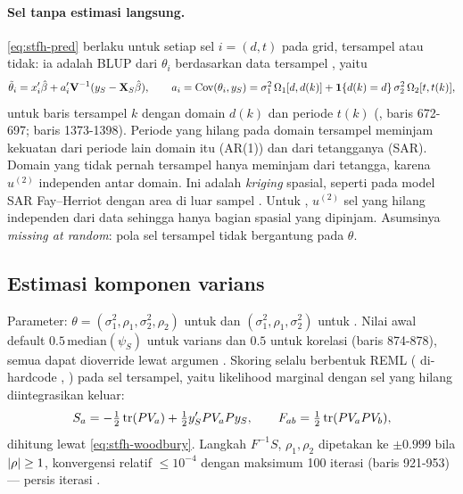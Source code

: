 \paragraph{Sel tanpa estimasi langsung.} \eqref{eq:stfh-pred} berlaku untuk
setiap sel $i=(d,t)$ pada grid, tersampel atau tidak: ia adalah BLUP dari
$\theta_i$ berdasarkan data tersampel \citep{saei2005out}, yaitu
\begin{equation}
  \tilde\theta_i=x_i'\hat\beta+a_i'\mathbf{V}^{-1}(y_S-\mathbf{X}_S\hat\beta),\qquad
  a_i=\mathrm{Cov}(\theta_i,y_S)=\sigma_1^2\,\Omega_1[d,d(k)]
  +\mathbf 1\{d(k)=d\}\,\sigma_2^2\,\Omega_2[t,t(k)],
  \label{eq:stfh-blup}
\end{equation}
untuk baris tersampel $k$ dengan domain $d(k)$ dan periode $t(k)$
(, baris 672-697; baris 1373-1398). Periode yang hilang
pada domain tersampel meminjam kekuatan dari periode lain domain itu (AR(1))
dan dari tetangganya (SAR). Domain yang tidak pernah tersampel hanya
meminjam dari tetangga, karena $u^{(2)}$ independen antar domain. Ini adalah
\emph{kriging} spasial, seperti pada model SAR Fay--Herriot dengan area di
luar sampel \citep{benedetti2024handling}. Untuk , $u^{(2)}$
sel yang hilang independen dari data sehingga hanya bagian spasial yang
dipinjam. Asumsinya \emph{missing at random}: pola sel tersampel tidak
bergantung pada $\theta$.

\subsection{Estimasi komponen varians}\label{sec:stfh-varians}

Parameter: $\theta=(\sigma_1^2,\rho_1,\sigma_2^2,\rho_2)$ untuk
 dan $(\sigma_1^2,\rho_1,\sigma_2^2)$ untuk . Nilai awal
default $0.5\,\mathrm{median}(\psi_S)$ untuk varians dan $0.5$ untuk korelasi
(baris 874-878), semua dapat dioverride lewat argumen .
Skoring selalu berbentuk REML ( di-hardcode ,
) pada sel tersampel, yaitu likelihood marginal
dengan sel yang hilang diintegrasikan keluar:
\begin{equation}
  S_a=-\tfrac12\operatorname{tr}(P V_a)+\tfrac12 y_S'P V_a P y_S,
  \qquad
  F_{ab}=\tfrac12\operatorname{tr}(P V_a P V_b),
  \label{eq:stfh-score}
\end{equation}
dihitung lewat \eqref{eq:stfh-woodbury}. Langkah $F^{-1}S$, $\rho_1,\rho_2$
dipetakan ke $\pm0.999$ bila $\left|\rho\right|\ge1$, konvergensi relatif $\le10^{-4}$
dengan maksimum 100 iterasi (baris 921-953) --- persis iterasi
.

